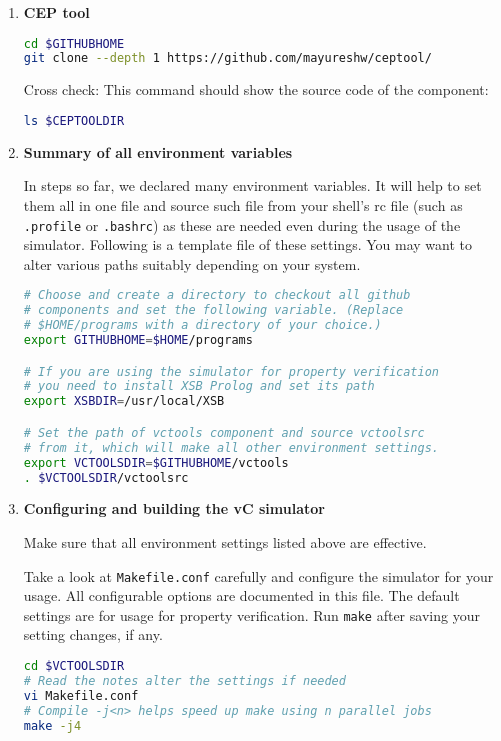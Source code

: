 \documentclass[12pt,a4paper]{article}
\begin{document}
\begin{enumerate}
\item \textbf{CEP tool}

\begin{lstlisting}[language=bash,style=snippet]
cd $GITHUBHOME
git clone --depth 1 https://github.com/mayureshw/ceptool/
\end{lstlisting}

Cross check: This command should show the source code of the component:

\begin{lstlisting}[language=bash,style=snippet]
ls $CEPTOOLDIR
\end{lstlisting}

\item \textbf{Summary of all environment variables}

In steps so far, we declared many environment variables. It will help to set them all in one file and source such file from your shell's rc file (such as \texttt{.profile} or \texttt{.bashrc}) as these are needed even during the usage of the simulator. Following is a template file of these settings. You may want to alter various paths suitably depending on your system.

\begin{lstlisting}[language=bash,style=snippet]
# Choose and create a directory to checkout all github
# components and set the following variable. (Replace
# $HOME/programs with a directory of your choice.)
export GITHUBHOME=$HOME/programs

# If you are using the simulator for property verification
# you need to install XSB Prolog and set its path
export XSBDIR=/usr/local/XSB

# Set the path of vctools component and source vctoolsrc
# from it, which will make all other environment settings.
export VCTOOLSDIR=$GITHUBHOME/vctools
. $VCTOOLSDIR/vctoolsrc
\end{lstlisting}

\item \textbf{Configuring and building the vC simulator}

Make sure that all environment settings listed above are effective.

Take a look at \texttt{Makefile.conf} carefully and configure the simulator for your usage. All configurable options are documented in this file. The default settings are for usage for property verification. Run \texttt{make} after saving your setting changes, if any.

\begin{lstlisting}[language=bash,style=snippet]
cd $VCTOOLSDIR
# Read the notes alter the settings if needed
vi Makefile.conf
# Compile -j<n> helps speed up make using n parallel jobs
make -j4
\end{lstlisting}


\end{enumerate}
\end{document}
